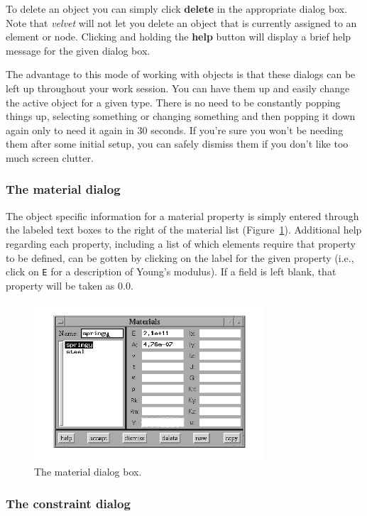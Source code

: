 To delete an object you can simply click {\bf delete} in the appropriate
dialog box.  Note that {\em velvet} will not let you delete an object that 
is currently assigned to an element or node.  Clicking and holding the 
{\bf help} button will display a brief help
message for the given dialog box.  

The advantage to this mode of working with objects is that these dialogs
can be left up throughout your work session.  You can have them up and
easily change the active object for a given type.  There is no need
to be constantly popping things up, selecting something or changing
something and then popping it down again only to need it again in 30
seconds.   If you're sure you won't be needing them after some initial
setup, you can safely dismiss them if you don't like too much screen
clutter.  

\subsubsection{The material dialog}

The object specific information for a material property is simply
entered through the labeled text boxes to the right of the material list
(Figure~\ref{velvet.material}).
Additional help regarding each property, including a list of which 
elements require that property to be defined, can be gotten by clicking
on the label for the given property (i.e., click on {\tt E} for
a description of Young's modulus).  If a field is left blank, that
property will be taken as 0.0.

\begin{figure}
\begin{center}
 \includegraphics[width=3.38in]{figures/velvet_material}
\end{center}
\caption{The material dialog box.}
\label{velvet.material}
\end{figure}

\subsubsection{The constraint dialog}

